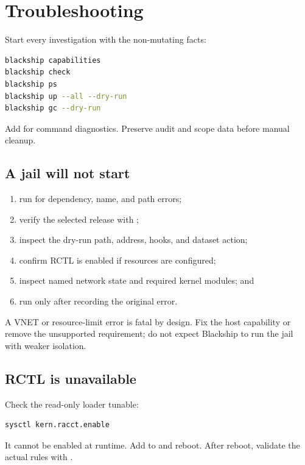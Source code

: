\chapter{Troubleshooting}
\label{ch:troubleshooting}

Start every investigation with the non-mutating facts:

\begin{lstlisting}[language=bash]
blackship capabilities
blackship check
blackship ps
blackship up --all --dry-run
blackship gc --dry-run
\end{lstlisting}

Add  for command diagnostics. Preserve audit and scope data
before manual cleanup.

\section{A jail will not start}

\begin{enumerate}
  \item run  for dependency, name, and path errors;
  \item verify the selected release with ;
  \item inspect the dry-run path, address, hooks, and dataset action;
  \item confirm RCTL is enabled if resources are configured;
  \item inspect named network state and required kernel modules; and
  \item run  only after recording the original error.
\end{enumerate}

A VNET or resource-limit error is fatal by design. Fix the host capability or
remove the unsupported requirement; do not expect Blackship to run the jail
with weaker isolation.

\section{RCTL is unavailable}

Check the read-only loader tunable:

\begin{lstlisting}[language=bash]
sysctl kern.racct.enable
\end{lstlisting}

It cannot be enabled at runtime. Add  to
 and reboot. After reboot, validate the actual rules
with .

